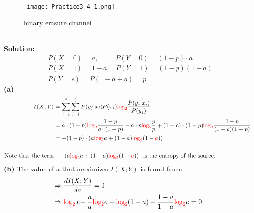\documentclass[a4paper,12pt]{article}
\begin{document}
\begin{enumerate}
            \begin{figure}[h]
                \centering
                \texttt{[image: Practice3-4-1.png]}
                \textcolor{red}{\caption{binary erasure channel}}
            \end{figure} \\ 
            \textbf{Solution:}
            \begin{align*}
                & P(X = 0) = a, \;\;\;\;\;\;\;\;\; P(Y = 0) = (1 - p) \cdot a \; \\
                & P(X = 1) = 1 - a, \;\;\; P(Y = 1) = (1 - p)(1 - a) \\
                & P(Y = e) = P(1 - a + a) = p \;
            \end{align*}
            \textbf{(a)} 
            \begin{align*}
                I(X;Y) &= \sum_{i = 1}^{2} \sum_{j = 1}^{3} P(y_j | x_i)P(x_i) \textcolor{red}{\log_2} \frac{P(y_j | x_i)}{P(y_j)} \\ 
                       &= a \cdot (1 - p) \textcolor{red}{\log_2} \frac{1 - p}{a \cdot (1 - p)} + a \cdot p \textcolor{red}{\log_2} \frac{p}{p} + (1 - a) \cdot (1 - p) \textcolor{red}{\log_2} \frac{1 - p}{(1 - a)(1 - p)} \\ 
                       &= -(1 - p) \cdot \left(a \textcolor{red}{\log_2} a + (1 - a) \textcolor{red}{\log_2} (1 - \textcolor{red}{a}) \right) \\ \\
                \text{Note that the term} & \;\; -\left(a \textcolor{red}{\log_2} a + (1 - a) \textcolor{red}{\log_2} (1 - \textcolor{red}{a}) \right) \;\; \text{is the entropy of the source.}
            \end{align*}
            \textbf{(b)} 
            The value of a that maximizes $I(X;Y)$ is found from:
            \begin{align*}
                & \Rightarrow \frac{dI(X;Y)}{da} = 0 \\ 
                & \Rightarrow \textcolor{red}{\log_2} a + \frac{a}{a} \textcolor{red}{\log_2} e - \textcolor{red}{\log_2} (1 - a) - \frac{1 - a}{1 - a} \textcolor{red}{\log_2} e = 0 \\ 

\end{align*}
\end{enumerate}
\end{document}
